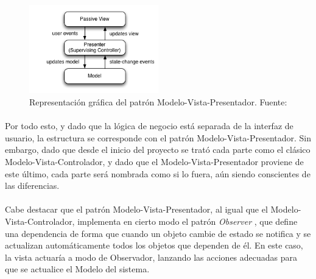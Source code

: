 \documentclass{subfiles}
\begin{document}
        \begin{figure}
        \centering
        \includegraphics[width=0.5\textwidth]{img/mvp.png}
        \caption[Representación gráfica del patrón Modelo-Vista-Presentador]{Representación gráfica del patrón Modelo-Vista-Presentador. Fuente: }
        \label{fig:mvp}
        \end{figure}

        \paragraph{}
        Por todo esto, y dado que la lógica de negocio está separada de la interfaz de usuario, la estructura se corresponde con el patrón Modelo-Vista-Presentador. Sin embargo, dado que desde el inicio del proyecto se trató cada parte como el clásico Modelo-Vista-Controlador, y dado que el Modelo-Vista-Presentador proviene de este último, cada parte será nombrada como si lo fuera, aún siendo conscientes de las diferencias.

        \paragraph{}
        Cabe destacar que el patrón Modelo-Vista-Presentador, al igual que el Modelo-Vista-Controlador, implementa en cierto modo el patrón \textit{Observer} \cite{book:gamma_erich_patronesdediseno}, que define una dependencia de forma que cuando un objeto cambie de estado se notifica y se actualizan automáticamente todos los objetos que dependen de él. En este caso, la vista actuaría a modo de Observador, lanzando las acciones adecuadas para que se actualice el Modelo del sistema.
\end{document}
